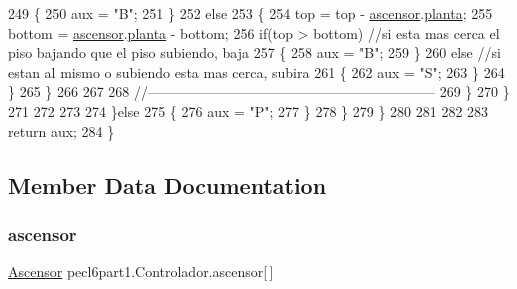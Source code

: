 \begin{DoxyCode}
249                         \{
250                             aux = \textcolor{stringliteral}{"B"};
251                         \}
252                         \textcolor{keywordflow}{else}
253                         \{
254                             top = top - \mbox{\hyperlink{classpecl6part1_1_1_controlador_ab1a946290b47216d355b09da476486db}{ascensor}}.\mbox{\hyperlink{classpecl6part1_1_1_ascensor_a580b836287ba07c6658c03a5e35fbbdb}{planta}};
255                             bottom = \mbox{\hyperlink{classpecl6part1_1_1_controlador_ab1a946290b47216d355b09da476486db}{ascensor}}.\mbox{\hyperlink{classpecl6part1_1_1_ascensor_a580b836287ba07c6658c03a5e35fbbdb}{planta}} - bottom;
256                             \textcolor{keywordflow}{if}(top > bottom) \textcolor{comment}{//si esta mas cerca el piso bajando que el piso subiendo, baja}
257                             \{
258                                 aux = \textcolor{stringliteral}{"B"};
259                             \}
260                             \textcolor{keywordflow}{else} \textcolor{comment}{//si estan al mismo o subiendo esta mas cerca, subira}
261                             \{
262                                 aux = \textcolor{stringliteral}{"S"};
263                             \}
264                         \}
265                     \}
266                     
267                     
268                   \textcolor{comment}{//--------------------------------------------------------------}
269                         \}
270                     \}
271                     
272                     
273                     
274                 \}\textcolor{keywordflow}{else}
275                 \{
276                     aux = \textcolor{stringliteral}{"P"};
277                 \}
278             \}
279         \}
280         
281         
282         
283         \textcolor{keywordflow}{return} aux;
284     \}
\end{DoxyCode}


\subsection{Member Data Documentation}
\mbox{\label{classpecl6part1_1_1_controlador_ab1a946290b47216d355b09da476486db}} 
\subsubsection{\texorpdfstring{ascensor}{ascensor}}
{\footnotesize\ttfamily \mbox{\hyperlink{classpecl6part1_1_1_ascensor}{Ascensor}} pecl6part1.\+Controlador.\+ascensor\mbox{[}$\,$\mbox{]}\hspace{0.3cm}{\ttfamily [package]}}

